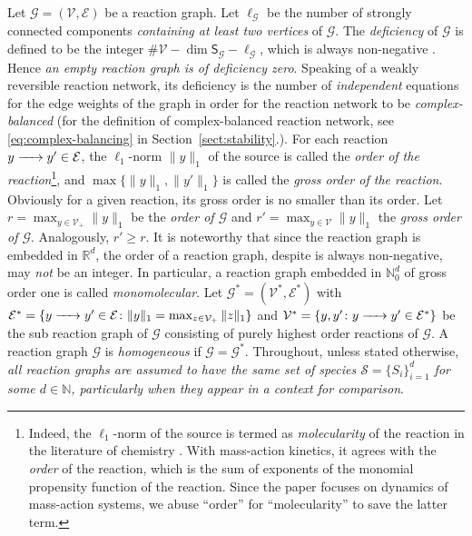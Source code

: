 \documentclass[10pt]{amsart}
\numberwithin{equation}{section}
\theoremstyle{plain}
\theoremstyle{definition}
\theoremstyle{remark}
\newcommand{\cE}{\mathcal{E}}
\newcommand{\cG}{\mathcal{G}}
\newcommand{\cV}{\mathcal{V}}
\begin{document}
Let $\cG=(\cV,\cE)$ be a reaction graph. Let $\ell_{\cG}$ be the number of  strongly connected components \emph{containing at least two vertices} of $\cG$.  The \emph{deficiency} of $\cG$ is defined to be the integer $\#\cV-\dim\mathsf{S}_{\cG}-\ell_{\cG}$, which is always non-negative  \cite{F19}. Hence \emph{an empty reaction graph is of deficiency zero}. Speaking of a weakly reversible  reaction network, its deficiency is the number of \emph{independent} equations for the edge weights of the graph in order for the reaction network to be \emph{complex-balanced} \cite{J12,F19} (for the definition of complex-balanced reaction network, see \eqref{eq:complex-balancing} in Section~\ref{sect:stability}.).  For each reaction $y\ce{->[]} y'\in\mathcal{E}$, the $\ell_1$-norm $\|y\|_1$ of the source is called the \emph{order of the reaction}\footnote{Indeed, the $\ell_1$-norm of the source is termed as \emph{molecularity} of the reaction in the literature of chemistry \cite{M67}. With mass-action kinetics, it agrees with the \emph{order} of the reaction, which is the sum of exponents of the monomial propensity function of the reaction. Since the paper focuses on dynamics of mass-action systems, we abuse ``order'' for ``molecularity'' to save the latter term.}, and $\max\{\|y\|_1,\|y'\|_1\}$ is called the \emph{gross order of the reaction}.
Obviously for a given reaction, its gross order is no smaller  than its order.
  Let $r=\max_{y\in\cV_+}\|y\|_1$ be the \emph{order of $\mathcal{G}$} and
$r'=\max_{y\in\cV}\|y\|_1$ the \emph{gross order of $\cG$}.  Analogously, $r'\ge r$. It is noteworthy that since the reaction graph is embedded in $\mathbb{R}^d$, the order of a reaction graph, despite is always non-negative, may \emph{not} be an integer.
In particular, a reaction graph embedded in $\mathbb{N}^d_0$ of gross order one is called \emph{monomolecular}. Let $\cG^*=(\cV^*,\cE^*)$ with $\cE^*=\{y\ce{->} y'\in\mathcal{E}\colon \|y\|_1=\max_{z\in\cV_+}\|z\|_1\}$ and $\cV^*=\{y,y'\colon y\ce{->}y'\in \cE^*\}$ be the sub reaction graph of $\cG$  consisting of purely  highest order
  reactions of $\cG$. A reaction graph $\cG$ is \emph{homogeneous} if $\cG=\cG^*$.  Throughout, unless stated otherwise, \emph{all reaction graphs are assumed to have the same set of species $\mathcal{S}=\{S_i\}_{i=1}^d$ for some $d\in\mathbb{N}$, particularly when they appear in a context for comparison}.
\end{document}

